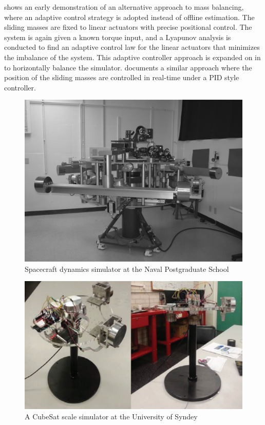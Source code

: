 \cite{kim_system_2006} shows an early demonstration of an alternative approach to mass balancing, where an adaptive control strategy is adopted instead of offline estimation. The sliding masses are fixed to linear actuators with precise positional control. The system is again given a known torque input, and a Lyapunov analysis is conducted to find an adaptive control law for the linear actuators that minimizes the imbalance of the system. This adaptive controller approach is expanded on in \cite{chesi_automatic_2014} to horizontally balance the simulator. \cite{choi_automatic_2016} documents a similar approach where the position of the sliding masses are controlled in real-time under a PID style controller. 

\begin{figure}[h]
    \centering
    \includegraphics[width=0.70\linewidth]{figures/NPS.png}
    \caption{Spacecraft dynamics simulator at the Naval Postgraduate School \cite{kim_automatic_2009}}
    \label{fig:NPS}
\end{figure}

\begin{figure}[h]
    \centering
    \includegraphics[width=0.80\linewidth]{figures/sydney.png}
    \caption{A CubeSat scale simulator at the University of Syndey \cite{kwan2015air}}
    \label{fig:sydney}
\end{figure}

